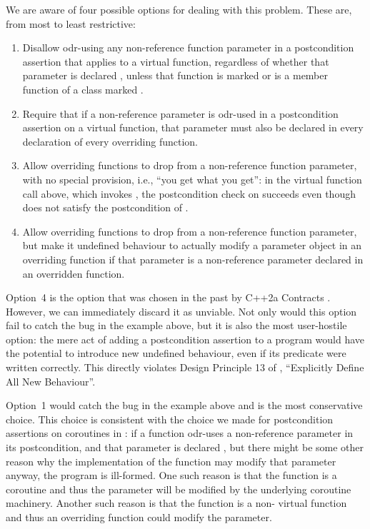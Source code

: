 We are aware of four possible options for dealing with this problem. These are, from most to least restrictive:
\begin{enumerate}
\item Disallow odr-using any non-reference function parameter in a postcondition assertion that applies to a virtual function, regardless of whether that parameter is declared , unless that function is marked  or is a member function of a class marked .
\item Require that if a non-reference parameter is odr-used in a postcondition assertion on a virtual function, that parameter must also be declared  in every declaration of every overriding function.
\item Allow overriding functions to drop  from a non-reference function parameter, with no special provision, i.e., ``you get what you get'': in the virtual function call above, which invokes , the postcondition check on  succeeds even though  does not satisfy the postcondition of .
\item Allow overriding functions to drop  from a non-reference function parameter, but make it undefined behaviour to actually modify a parameter object in an overriding function if that parameter is a non-reference parameter declared  in an overridden function.
\end{enumerate}

Option~4 is the option that was chosen in the past by C++2a Contracts \cite{P0542R5}. However, we can immediately discard it as unviable. Not only would this option fail to catch the bug in the example above, but it is also the most user-hostile option: the mere act of adding a postcondition assertion to a program would have the potential to introduce new undefined behaviour, even if its predicate were written correctly. This directly violates Design Principle 13 of \cite{P2900R10}, ``Explicitly Define All New Behaviour''.

Option~1 would catch the bug in the example above and is the most conservative choice. This choice is consistent with the choice we made for postcondition assertions on coroutines in \cite{P2900R10}: if a function odr-uses a non-reference parameter in its postcondition, and that parameter is declared , but there might be some other reason why the implementation of the function may modify that parameter anyway, the program is ill-formed. One such reason is that the function is a coroutine and thus the parameter will be modified by the underlying coroutine machinery. Another such reason is that the function is a non- virtual function and thus an overriding function could modify the parameter.


